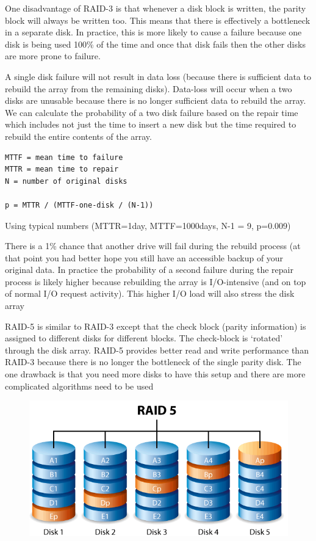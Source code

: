One disadvantage of RAID-3 is that whenever a disk block is written, the parity block will always be written too. This means that there is effectively a bottleneck in a separate disk. In practice, this is more likely to cause a failure because one disk is being used 100\% of the time and once that disk fails then the other disks are more prone to failure.

A single disk failure will not result in data loss (because there is sufficient data to rebuild the array from the remaining disks). Data-loss will occur when a two disks are unusable because there is no longer sufficient data to rebuild the array. We can calculate the probability of a two disk failure based on the repair time which includes not just the time to insert a new disk but the time required to rebuild the entire contents of the array.

\begin{lstlisting}
MTTF = mean time to failure
MTTR = mean time to repair
N = number of original disks

p = MTTR / (MTTF-one-disk / (N-1))
\end{lstlisting}

Using typical numbers (MTTR=1day, MTTF=1000days, N-1 = 9, p=0.009)

There is a 1\% chance that another drive will fail during the rebuild process (at that point you had better hope you still have an accessible backup of your original data. In practice the probability of a second failure during the repair process is likely higher because rebuilding the array is I/O-intensive (and on top of normal I/O request activity). This higher I/O load will also stress the disk array

RAID-5 is similar to RAID-3 except that the check block (parity information) is assigned to different disks for different blocks. The check-block is `rotated' through the disk array. RAID-5 provides better read and write performance than RAID-3 because there is no longer the bottleneck of the single parity disk. The one drawback is that you need more disks to have this setup and there are more complicated algorithms need to be used

\begin{figure}[htbp]
\centering
\includegraphics[width=.8\textwidth]{filesystems/images/raid_5.png}
\caption{}
\end{figure}

